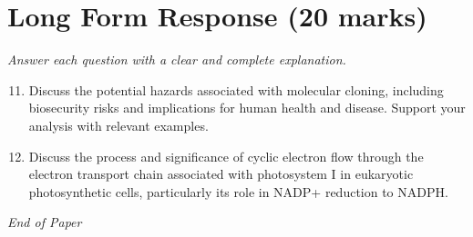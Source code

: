 \documentclass[12pt]{article}
\begin{document}
\section*{Long Form Response (20 marks)}
\textit{Answer each question with a clear and complete explanation.}
\begin{enumerate}[label=\arabic*.]
\setcounter{enumi}{10}
\item Discuss the potential hazards associated with molecular cloning, including biosecurity risks and implications for human health and disease. Support your analysis with relevant examples.
\item Discuss the process and significance of cyclic electron flow through the electron transport chain associated with photosystem I in eukaryotic photosynthetic cells, particularly its role in NADP+ reduction to NADPH.
\end{enumerate}

\vfill
\noindent\textit{End of Paper}
\end{document}
